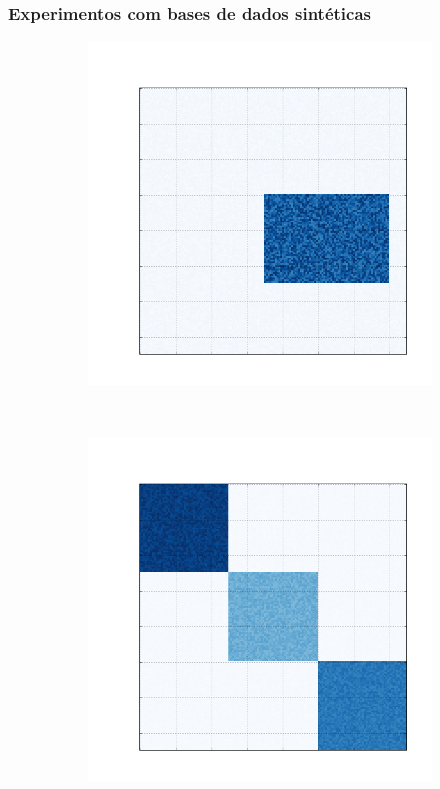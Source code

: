 \documentclass[10pt]{beamer}
\begin{document}
\begin{frame}
\frametitle{Experimentos com bases de dados sintéticas}

  \begin{figure} [htpb]
  \centering
      \begin{subfigure}[b]{0.16\textwidth}
          \includegraphics[width=\textwidth]{img/a-bic-structure.png}
          \caption{}
          \label{fig:bic-syntetic-structure:a}
      \end{subfigure}
      ~
      \begin{subfigure}[b]{0.16\textwidth}
          \includegraphics[width=\textwidth]{img/b-bic-structure.png}

\end{subfigure}
\end{figure}
\end{frame}
\end{document}

